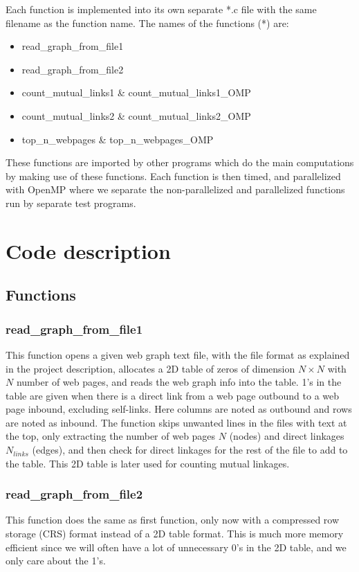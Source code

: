 \documentclass[12pt,a4paper,english]{article}
\begin{document}
Each function is implemented into its own separate *.c file with the same filename as the function name. The names of the functions (*) are:
\begin{itemize}
	\item read\_graph\_from\_file1
	\item read\_graph\_from\_file2
	\item count\_mutual\_links1 \& count\_mutual\_links1\_OMP
	\item count\_mutual\_links2 \& count\_mutual\_links2\_OMP
	\item top\_n\_webpages \& top\_n\_webpages\_OMP
\end{itemize}
These functions are imported by other programs which do the main computations by making use of these functions. Each function is then timed, and parallelized with OpenMP where we separate the non-parallelized and parallelized functions run by separate test programs.

\section{Code description}
\label{sect:Code_descr}
\subsection{Functions}
\label{subsect:Functions}
\subsubsection{read\_graph\_from\_file1}
This function opens a given web graph text file, with the file format as explained in the project description, allocates a 2D table of zeros of dimension $N\times N$ with $N$ number of web pages, and reads the web graph info into the table. 1's in the table are given when there is a direct link from a web page outbound to a web page inbound, excluding self-links. Here columns are noted as outbound and rows are noted as inbound. The function skips unwanted lines in the files with text at the top, only extracting the number of web pages $N$ (nodes) and direct linkages $N_{links}$ (edges), and then check for direct linkages for the rest of the file to add to the table. This 2D table is later used for counting mutual linkages.

\subsubsection{read\_graph\_from\_file2}
This function does the same as first function, only now with a compressed row storage (CRS) format instead of a 2D table format. This is much more memory efficient since we will often have a lot of unnecessary 0's in the 2D table, and we only care about the 1's. 
\end{document}
